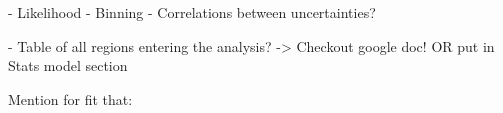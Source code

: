 - Likelihood
- Binning
- Correlations between uncertainties?

- Table of all regions entering the analysis? -> Checkout google doc! OR put in Stats model section

Mention for fit that:



